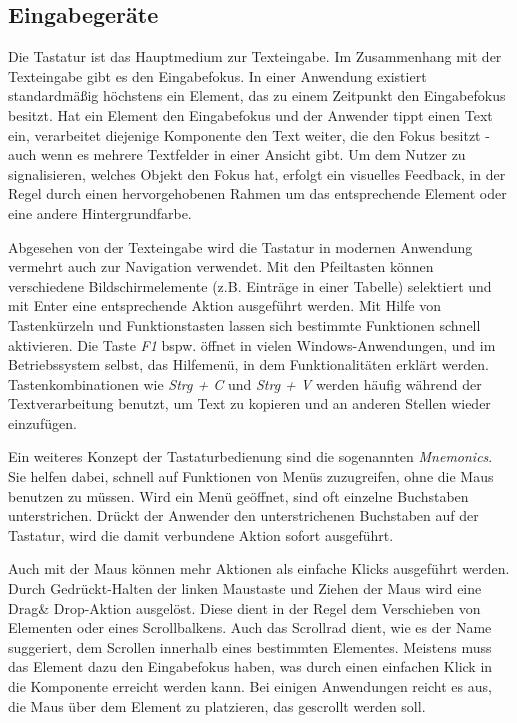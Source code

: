 \subsection{Eingabegeräte} \label{sec:inputDevices}
Die Tastatur ist das Hauptmedium zur Texteingabe. Im Zusammenhang mit der Texteingabe gibt es den Eingabefokus. In einer Anwendung existiert standardmäßig höchstens ein Element, das zu einem Zeitpunkt den Eingabefokus besitzt. Hat ein Element den Eingabefokus und der Anwender tippt einen Text ein, verarbeitet diejenige Komponente den Text weiter, die den Fokus besitzt - auch wenn es mehrere Textfelder in einer Ansicht gibt. Um dem Nutzer zu signalisieren, welches Objekt den Fokus hat, erfolgt ein visuelles Feedback, in der Regel durch einen hervorgehobenen Rahmen um das entsprechende Element oder eine andere Hintergrundfarbe. \cite[S. 134]{Moser2012}\par
Abgesehen von der Texteingabe wird die Tastatur in modernen Anwendung vermehrt auch zur Navigation verwendet. Mit den Pfeiltasten können verschiedene Bildschirmelemente (z.B. Einträge in einer Tabelle) selektiert und mit Enter eine entsprechende Aktion ausgeführt werden. Mit Hilfe von Tastenkürzeln und Funktionstasten lassen sich bestimmte Funktionen schnell aktivieren. Die Taste \textit{F1} bspw. öffnet in vielen Windows-Anwendungen, und im Betriebssystem selbst, das Hilfemenü, in dem Funktionalitäten erklärt werden. Tastenkombinationen wie \textit{Strg + C} und \textit{Strg + V} werden häufig während der Textverarbeitung benutzt, um Text zu kopieren und an anderen Stellen wieder einzufügen.\par
Ein weiteres Konzept der Tastaturbedienung sind die sogenannten \textit{Mnemonics}. Sie helfen dabei, schnell auf Funktionen von Menüs zuzugreifen, ohne die Maus benutzen zu müssen. Wird ein Menü geöffnet, sind oft einzelne Buchstaben unterstrichen. Drückt der Anwender den unterstrichenen Buchstaben auf der Tastatur, wird die damit verbundene Aktion sofort ausgeführt.\par
{}
Auch mit der Maus können mehr Aktionen als einfache Klicks ausgeführt werden. Durch Gedrückt-Halten der linken Maustaste und Ziehen der Maus wird eine Drag\& Drop-Aktion ausgelöst. Diese dient in der Regel dem Verschieben von Elementen oder eines Scrollbalkens. Auch das Scrollrad dient, wie es der Name suggeriert, dem Scrollen innerhalb eines bestimmten Elementes. Meistens muss das Element dazu den Eingabefokus haben, was durch einen einfachen Klick in die Komponente erreicht werden kann. Bei einigen Anwendungen reicht es aus, die Maus über dem Element zu platzieren, das gescrollt werden soll.\par
